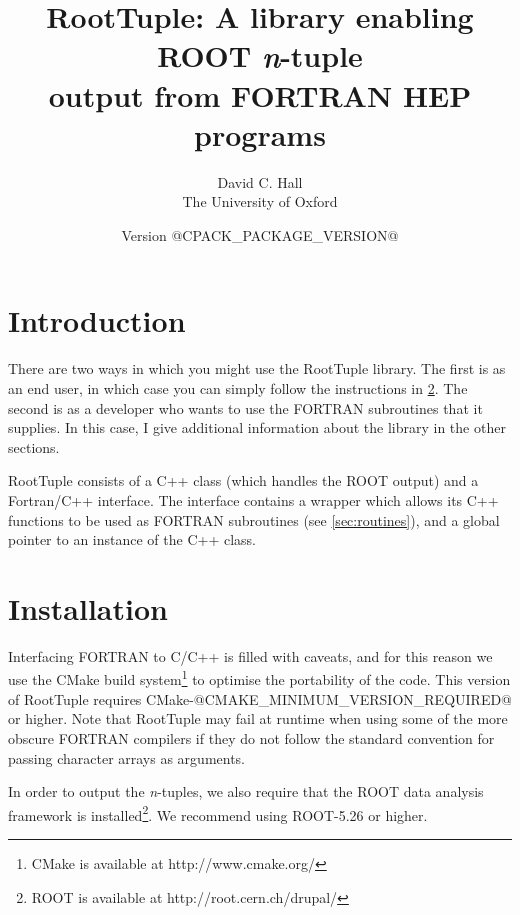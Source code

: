 \documentclass[a4paper,12pt]{article}
\begin{document}
\title{RootTuple: A library enabling ROOT \emph{n}-tuple\\ output from FORTRAN HEP programs}
\author{David C. Hall\\ The University of Oxford}
\date{Version @CPACK_PACKAGE_VERSION@}
\maketitle

\tableofcontents
\newpage

\section{Introduction}
\label{sec:intro}
There are two ways in which you might use the RootTuple library. The first is as an end user, in which case you can simply follow the instructions in \textsection\ref{sec:install}. The second is as a developer who wants to use the FORTRAN subroutines that it supplies. In this case, I give additional information about the library in the other sections.

RootTuple consists of a C++ class (which handles the ROOT output) and a Fortran/C++ interface. The interface contains a wrapper which allows its C++ functions to be used as FORTRAN subroutines (see \textsection\ref{sec:routines}), and a global pointer to an instance of the C++ class.

\section{Installation}
\label{sec:install}
Interfacing FORTRAN to C/C++ is filled with caveats, and for this reason we use the CMake build system\footnote{CMake is available at http://www.cmake.org/} to optimise the portability of the code. This version of RootTuple requires CMake-@CMAKE_MINIMUM_VERSION_REQUIRED@ or higher. Note that RootTuple may fail at runtime when using some of the more obscure FORTRAN compilers if they do not follow the standard convention for passing character arrays as arguments.

In order to output the \emph{n}-tuples, we also require that the ROOT data analysis framework is installed\footnote{ROOT is available at http://root.cern.ch/drupal/}. We recommend using ROOT-5.26 or higher.
\end{document}
